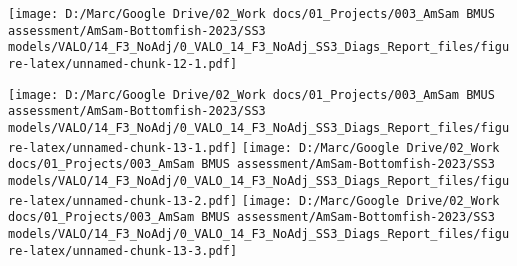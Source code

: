 \documentclass[
]{article}
\begin{document}
\texttt{[image: D:/Marc/Google Drive/02\_Work docs/01\_Projects/003\_AmSam BMUS assessment/AmSam-Bottomfish-2023/SS3 models/VALO/14\_F3\_NoAdj/0\_VALO\_14\_F3\_NoAdj\_SS3\_Diags\_Report\_files/figure-latex/unnamed-chunk-12-1.pdf]}

\texttt{[image: D:/Marc/Google Drive/02\_Work docs/01\_Projects/003\_AmSam BMUS assessment/AmSam-Bottomfish-2023/SS3 models/VALO/14\_F3\_NoAdj/0\_VALO\_14\_F3\_NoAdj\_SS3\_Diags\_Report\_files/figure-latex/unnamed-chunk-13-1.pdf]}
\texttt{[image: D:/Marc/Google Drive/02\_Work docs/01\_Projects/003\_AmSam BMUS assessment/AmSam-Bottomfish-2023/SS3 models/VALO/14\_F3\_NoAdj/0\_VALO\_14\_F3\_NoAdj\_SS3\_Diags\_Report\_files/figure-latex/unnamed-chunk-13-2.pdf]}
\texttt{[image: D:/Marc/Google Drive/02\_Work docs/01\_Projects/003\_AmSam BMUS assessment/AmSam-Bottomfish-2023/SS3 models/VALO/14\_F3\_NoAdj/0\_VALO\_14\_F3\_NoAdj\_SS3\_Diags\_Report\_files/figure-latex/unnamed-chunk-13-3.pdf]}

\hypertarget{section}{%
\subsection{}\label{section}}
\end{document}
